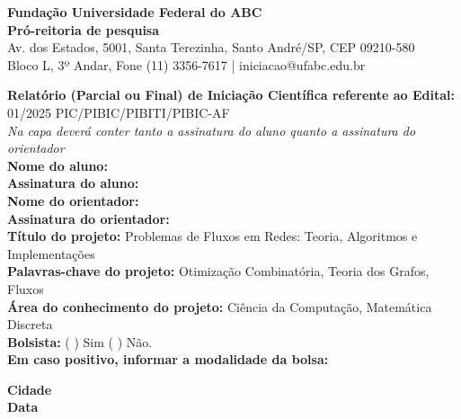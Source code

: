 \documentclass[12pt,a4paper]{article}
\begin{document}
\onehalfspacing

\begin{center}
    \textbf{Fundação Universidade Federal do ABC}\\
    \textbf{Pró-reitoria de pesquisa}\\
    \small Av. dos Estados, 5001, Santa Terezinha, Santo André/SP, CEP 09210-580\\
    Bloco L, 3º Andar, Fone (11) 3356-7617 | iniciacao@ufabc.edu.br
\end{center}
\vspace{0.8cm}

\noindent \textbf{Relatório (Parcial ou Final) de Iniciação Científica referente ao Edital:} 01/2025 PIC/PIBIC/PIBITI/PIBIC-AF \\[0.5cm]
\noindent \emph{Na capa deverá conter tanto a assinatura do aluno quanto a assinatura do orientador}\\[0.5cm]
\noindent \textbf{Nome do aluno:} \hrulefill \\
\noindent \textbf{Assinatura do aluno:} \hrulefill \\[0.5cm]
\noindent \textbf{Nome do orientador:} \hrulefill \\
\noindent \textbf{Assinatura do orientador:} \hrulefill \\[0.5cm]
\noindent \textbf{Título do projeto:} Problemas de Fluxos em Redes: Teoria, Algoritmos e Implementações \\[0.5cm]
\noindent \textbf{Palavras-chave do projeto:} Otimização Combinatória, Teoria dos Grafos, Fluxos \\[0.5cm]
\noindent \textbf{Área do conhecimento do projeto:} Ciência da Computação, Matemática Discreta \\[0.5cm]
\noindent \textbf{Bolsista:} ( \quad ) Sim \quad ( \quad ) Não. \\
\textbf{Em caso positivo, informar a modalidade da bolsa:} \hrulefill \\[1cm]

\begin{center}
    \textbf{Cidade}\\
    \textbf{Data}
\end{center}

\vspace{1cm}

\renewcommand{\contentsname}{Sumário}
\tableofcontents
\newpage

\end{document}
